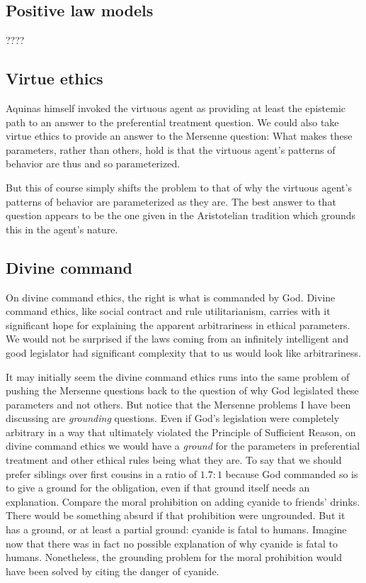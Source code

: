 \subsection{Positive law models}
????

\subsection{Virtue ethics}
Aquinas himself invoked the virtuous agent as providing at least the epistemic path to an answer to the preferential treatment
question. We could also take virtue ethics to provide an answer to the Mersenne question: What makes these parameters, rather
than others, hold is that the virtuous agent's patterns of behavior are thus and so parameterized.

But this of course simply shifts the problem to that of why the virtuous agent's patterns of behavior are parameterized as
they are. The best answer to that question appears to be the one given in the Aristotelian tradition which grounds this in
the agent's nature.

\subsection{Divine command}
On divine command ethics, the right is what is commanded by God.
Divine command ethics, like social contract and rule utilitarianism, carries with it significant hope for explaining the apparent
arbitrariness in ethical parameters. We would not be surprised if the laws coming from an infinitely intelligent and good legislator 
had significant complexity that to us would look like arbitrariness. 

It may initially seem the divine command ethics runs into the same problem of pushing the Mersenne questions back to the
question of why God legislated these parameters and not others. But notice that the Mersenne problems I have been discussing
are \textit{grounding} questions. Even if God's legislation were completely arbitrary in a way that ultimately violated the
Principle of Sufficient Reason, on divine command ethics we would have a \textit{ground} for the parameters in preferential
treatment and other ethical rules being what they are. To say that we should prefer siblings over first cousins in a ratio
of $1.7:1$ because God commanded so is to give a ground for the obligation, even if that ground itself needs an explanation.
Compare the moral prohibition on adding cyanide to friends' drinks. There would be something absurd if that prohibition were
ungrounded. But it has a ground, or at least a partial ground: cyanide is fatal to humans. Imagine now that there was in fact 
no possible explanation of why cyanide is fatal to humans. Nonetheless, the grounding problem for the moral prohibition would
have been solved by citing the danger of cyanide.

